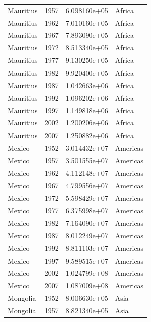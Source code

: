 \documentclass[
  letterpaper,
  DIV=11,
  numbers=noendperiod]{scrreprt}
\begin{document}
\begin{tcolorbox}
\begin{tabular}{lrrl}
Mauritius                &  1957 &  6.098160e+05 &    Africa \\
Mauritius                &  1962 &  7.010160e+05 &    Africa \\
Mauritius                &  1967 &  7.893090e+05 &    Africa \\
Mauritius                &  1972 &  8.513340e+05 &    Africa \\
Mauritius                &  1977 &  9.130250e+05 &    Africa \\
Mauritius                &  1982 &  9.920400e+05 &    Africa \\
Mauritius                &  1987 &  1.042663e+06 &    Africa \\
Mauritius                &  1992 &  1.096202e+06 &    Africa \\
Mauritius                &  1997 &  1.149818e+06 &    Africa \\
Mauritius                &  2002 &  1.200206e+06 &    Africa \\
Mauritius                &  2007 &  1.250882e+06 &    Africa \\
Mexico                   &  1952 &  3.014432e+07 &  Americas \\
Mexico                   &  1957 &  3.501555e+07 &  Americas \\
Mexico                   &  1962 &  4.112148e+07 &  Americas \\
Mexico                   &  1967 &  4.799556e+07 &  Americas \\
Mexico                   &  1972 &  5.598429e+07 &  Americas \\
Mexico                   &  1977 &  6.375998e+07 &  Americas \\
Mexico                   &  1982 &  7.164090e+07 &  Americas \\
Mexico                   &  1987 &  8.012249e+07 &  Americas \\
Mexico                   &  1992 &  8.811103e+07 &  Americas \\
Mexico                   &  1997 &  9.589515e+07 &  Americas \\
Mexico                   &  2002 &  1.024799e+08 &  Americas \\
Mexico                   &  2007 &  1.087009e+08 &  Americas \\
Mongolia                 &  1952 &  8.006630e+05 &      Asia \\
Mongolia                 &  1957 &  8.821340e+05 &      Asia \\

\end{tabular}
\end{tcolorbox}
\end{document}
